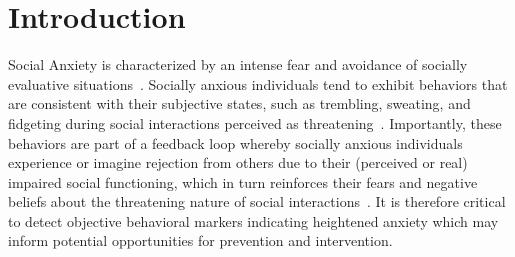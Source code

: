 \section{Introduction}
\label{intro}
Social Anxiety is characterized by an intense fear and avoidance of socially evaluative situations~\cite{APA2013}.  Socially anxious individuals tend to exhibit behaviors that are consistent with their subjective states, such as trembling, sweating, and fidgeting during social interactions perceived as threatening~\cite{stein2008,wenzel2005}. Importantly, these behaviors are part of a feedback loop whereby socially anxious individuals experience or imagine rejection from others due to their (perceived or real) impaired social functioning, which in turn reinforces their fears and negative beliefs about the threatening nature of social interactions~\cite{chambless2002,wenzel2005}.  It is therefore critical to detect objective behavioral markers indicating heightened anxiety which may inform potential opportunities for prevention and intervention.   

